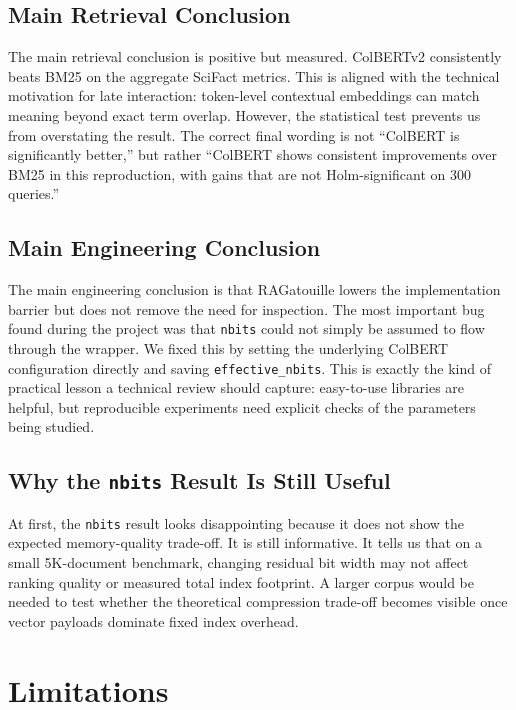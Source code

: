 \documentclass[sigconf,nonacm]{acmart}
\begin{document}
\subsection{Main Retrieval Conclusion}

The main retrieval conclusion is positive but measured. ColBERTv2 consistently
beats BM25 on the aggregate SciFact metrics. This is aligned with the technical
motivation for late interaction: token-level contextual embeddings can match
meaning beyond exact term overlap. However, the statistical test prevents us
from overstating the result. The correct final wording is not ``ColBERT is
significantly better,'' but rather ``ColBERT shows consistent improvements over
BM25 in this reproduction, with gains that are not Holm-significant on 300
queries.''

\subsection{Main Engineering Conclusion}

The main engineering conclusion is that RAGatouille lowers the implementation
barrier but does not remove the need for inspection. The most important bug
found during the project was that \texttt{nbits} could not simply be assumed to
flow through the wrapper. We fixed this by setting the underlying ColBERT
configuration directly and saving \texttt{effective\_nbits}. This is exactly
the kind of practical lesson a technical review should capture: easy-to-use
libraries are helpful, but reproducible experiments need explicit checks of the
parameters being studied.

\subsection{Why the \texttt{nbits} Result Is Still Useful}

At first, the \texttt{nbits} result looks disappointing because it does not show
the expected memory-quality trade-off. It is still informative. It tells us
that on a small 5K-document benchmark, changing residual bit width may not
affect ranking quality or measured total index footprint. A larger corpus would
be needed to test whether the theoretical compression trade-off becomes visible
once vector payloads dominate fixed index overhead.

\section{Limitations}
\end{document}
